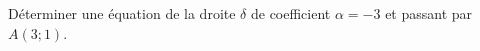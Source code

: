 
Déterminer une équation de la droite $\delta$ de coefficient $\alpha=-3$ et passant par $A(3;1)$.

